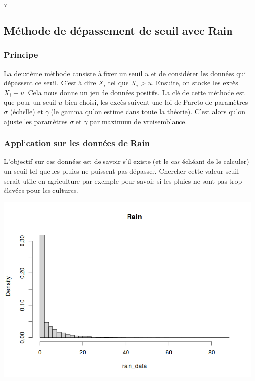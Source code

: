 \documentclass{article}
\begin{document}
v
\subsection{Méthode de dépassement de seuil avec \textbf{Rain}}

\subsubsection{Principe}

La deuxième méthode consiste à fixer un seuil $u$ et de considérer les données qui dépassent ce seuil. C'est à dire $X_i$ tel que $X_i > u$.
Ensuite, on stocke les excès $X_i - u$. Cela nous donne un jeu de données positifs.
La clé de cette méthode est que pour un seuil $u$ bien choisi, les excès suivent une loi de Pareto de paramètres $\sigma$ (échelle) et $\gamma$ (le gamma qu'on estime dans toute la théorie).
C'est alors qu'on ajuste les paramètres $\sigma$ et $\gamma$ par maximum de vraisemblance.

\subsubsection{Application sur les données de Rain}

L'objectif sur ces données est de savoir s'il existe (et le cas échéant de le calculer) un seuil tel que les pluies ne puissent pas dépasser.
Chercher cette valeur seuil serait utile en agriculture par exemple pour savoir si les pluies ne sont pas trop élevées pour les cultures.

\begin{center}
	\includegraphics[scale=0.8]{./images/rainhisto.png} 
\end{center}
\end{document}
